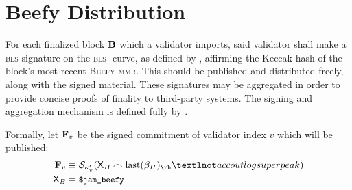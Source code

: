 \section{Beefy Distribution}\label{sec:beefy}

For each finalized block $\mathbf{B}$ which a validator imports, said validator shall make a \textsc{bls} signature on the \textsc{bls}- curve, as defined by \cite{bls12-381}, affirming the Keccak hash of the block's most recent \textsc{Beefy} \textsc{mmr}. This should be published and distributed freely, along with the signed material. These signatures may be aggregated in order to provide concise proofs of finality to third-party systems. The signing and aggregation mechanism is defined fully by \cite{cryptoeprint:2022/1611}.

Formally, let $\mathbf{F}_{v}$ be the signed commitment of validator index $v$ which will be published:
\begin{align}\label{eq:beefysignedcommitment}
  \mathbf{F}\sub{v} &\equiv \signdata{\activeset'\sub{v}}{\mathsf{X}_B \concat \text{last}(\recenthistory)_\rh¬accoutlogsuperpeak}\\
  \mathsf{X}_B &= \token{\$jam\_beefy}
\end{align}
